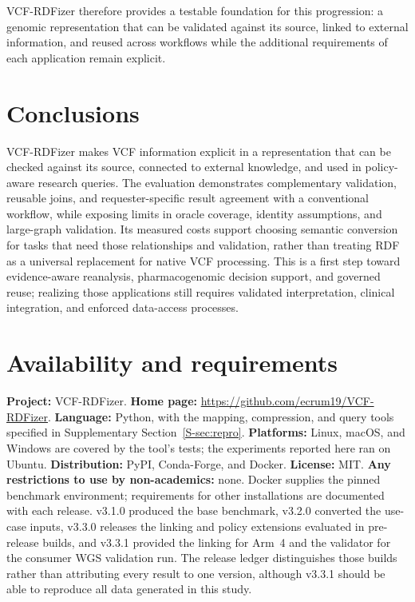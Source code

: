 \documentclass[pdflatex,sn-mathphys-num]{sn-jnl}
\begin{document}
VCF-RDFizer therefore provides a testable foundation for this progression: a genomic representation that can be validated against its source, linked to external information, and reused across workflows while the additional requirements of each application remain explicit.

\section{Conclusions}\label{sec:conclusions}
VCF-RDFizer makes VCF information explicit in a representation that can be checked against its source, connected to external knowledge, and used in policy-aware research queries.
The evaluation demonstrates complementary validation, reusable joins, and requester-specific result agreement with a conventional workflow, while exposing limits in oracle coverage, identity assumptions, and large-graph validation.
Its measured costs support choosing semantic conversion for tasks that need those relationships and validation, rather than treating RDF as a universal replacement for native VCF processing.
This is a first step toward evidence-aware reanalysis, pharmacogenomic decision support, and governed reuse; realizing those applications still requires validated interpretation, clinical integration, and enforced data-access processes.

\section*{Availability and requirements}
\textbf{Project:} VCF-RDFizer.
\textbf{Home page:} \url{https://github.com/ecrum19/VCF-RDFizer}.
\textbf{Language:} Python, with the mapping, compression, and query tools specified in Supplementary Section~\ref{S-sec:repro}.
\textbf{Platforms:} Linux, macOS, and Windows are covered by the tool's tests; the experiments reported here ran on Ubuntu.
\textbf{Distribution:} PyPI, Conda-Forge, and Docker.
\textbf{License:} MIT.
\textbf{Any restrictions to use by non-academics:} none.
Docker supplies the pinned benchmark environment; requirements for other installations are documented with each release.
v3.1.0 produced the base benchmark, v3.2.0 converted the use-case inputs, v3.3.0 releases the linking and policy extensions evaluated in pre-release builds, and v3.3.1 provided the linking for Arm~4 and the validator for the consumer WGS validation run.
The release ledger distinguishes those builds rather than attributing every result to one version, although v3.3.1 should be able to reproduce all data generated in this study.
\end{document}
